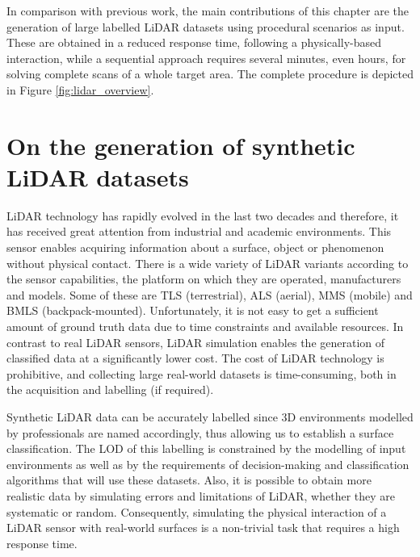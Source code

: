 In comparison with previous work, the main contributions of this chapter are the generation of large labelled LiDAR datasets using procedural scenarios as input. These are obtained in a reduced response time, following a physically-based interaction, while a sequential approach requires several minutes, even hours, for solving complete scans of a whole target area. The complete procedure is depicted in Figure \ref{fig:lidar_overview}. 

\section{On the generation of synthetic LiDAR datasets}

LiDAR technology has rapidly evolved in the last two decades and therefore, it has received great attention from industrial and academic environments. This sensor enables acquiring information about a surface, object or phenomenon without physical contact. There is a wide variety of LiDAR variants according to the sensor capabilities, the platform on which they are operated, manufacturers and models. Some of these are TLS (terrestrial), ALS (aerial), MMS (mobile) and BMLS (backpack-mounted). Unfortunately, it is not easy to get a sufficient amount of ground truth data due to time constraints and available resources. In contrast to real LiDAR sensors, LiDAR simulation enables the generation of classified data at a significantly lower cost. The cost of LiDAR technology is prohibitive, and collecting large real-world datasets is time-consuming, both in the acquisition and labelling (if required). 

Synthetic LiDAR data can be accurately labelled since 3D environments modelled by professionals are named accordingly, thus allowing us to establish a surface classification. The LOD of this labelling is constrained by the modelling of input environments as well as by the requirements of decision-making and classification algorithms that will use these datasets. Also, it is possible to obtain more realistic data by simulating errors and limitations of LiDAR, whether they are systematic or random. Consequently, simulating the physical interaction of a LiDAR sensor with real-world surfaces is a non-trivial task that requires a high response time. 

